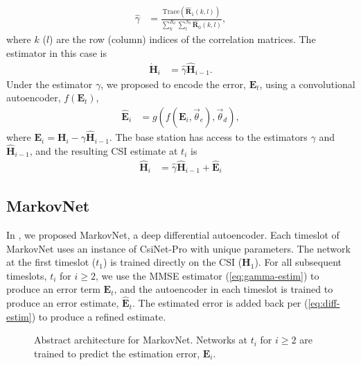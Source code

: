 \begin{align}
	\hat \gamma &= \frac{\text{Trace}(\hat{\mathbf R}_1(k,l))}{\sum_k^{R_d}\sum_l^{N_b}\hat{\mathbf R}_0(k,l)}, \label{eq:gamma-hat}
\end{align}
where $k$ ($l$) are the row (column) indices of the correlation matrices. The estimator in this case is 
\begin{align}
	\grave{\mathbf H}_i &= \hat\gamma \hat{\mathbf H}_{i-1} \label{eq:gamma-estim}.
\end{align}
Under the estimator $\gamma$, we proposed to encode the error, $\mathbf E_t$, using a convolutional autoencoder, $f(\mathbf E_t)$,
\begin{align*}
	\hat{\mathbf E}_i &= g(f(\mathbf E_i, \vec\theta_e), \vec\theta_d),
\end{align*}
where $\mathbf E_i = \mathbf H_i - \gamma\hat{\mathbf H}_{i-1}$. The base station has access to the estimators $\gamma$ and $\hat{\mathbf H}_{i-1}$, and the resulting CSI estimate at $t_i$ is
\begin{align}
	\hat{\mathbf H}_i &= \hat\gamma \hat{\mathbf H}_{i-1} + \hat{\mathbf{E}}_i \label{eq:diff-estim}
\end{align}

\subsection{MarkovNet}

In \cite{ref:Liu2020MarkovNet}, we proposed MarkovNet, a deep differential autoencoder. Each timeslot of MarkovNet uses an instance of CsiNet-Pro with unique parameters. The network at the first timeslot ($t_1$) is trained directly on the CSI ($\mathbf H_1$). For all subsequent timeslots, $t_i$ for $i \geq 2$, we use the MMSE estimator (\ref{eq:gamma-estim}) to produce an error term $\mathbf E_t$, and the autoencoder in each timeslot is trained to produce an error estimate, $\hat{\mathbf E}_t$. The estimated error is added back per (\ref{eq:diff-estim}) to produce a refined estimate.

\begin{figure}[!hbtp]
    \centering
    {
      \fontsize{6pt}{8pt}
      \def\svgwidth{0.8\columnwidth}
      
    }
    \caption{Abstract architecture for MarkovNet. Networks at $t_i$ for $i \geq 2$ are trained to predict the estimation error, $\mathbf E_i$.}
    \label{fig:markovnet_schema}
\end{figure}

